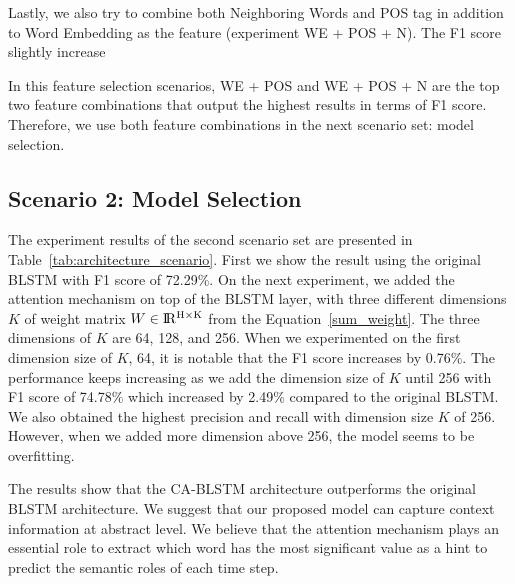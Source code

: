 {{Lastly, we also try to combine both Neighboring Words and POS tag in addition to Word Embedding as the feature (experiment WE + POS + N). The F1 score slightly increase


In this feature selection scenarios, WE + POS and WE + POS + N are the top two feature combinations that output the highest results in terms of F1 score. Therefore, we use both feature combinations in the next scenario set: model selection.

\subsection{Scenario 2: Model Selection}
The experiment results of the second scenario set are presented in Table~\ref{tab:architecture_scenario}. First we show the result using the original BLSTM with F1 score of 72.29\%. On the next experiment, we added the attention mechanism on top of the BLSTM layer, with three different dimensions $K$ of weight matrix $W \in {\rm I\!R^{H \times K}}$ from the Equation~\ref{sum_weight}. The three dimensions of $K$ are 64, 128, and 256. When we experimented on the first dimension size of $K$, 64, it is notable that the F1 score increases by 0.76\%. The performance keeps increasing as we add the dimension size of $K$ until 256 with F1 score of 74.78\% which increased by 2.49\% compared to the original BLSTM. We also obtained the highest precision and recall with dimension size $K$ of 256. However, when we added more dimension above 256, the model seems to be overfitting.

The results show that the CA-BLSTM architecture outperforms the original BLSTM architecture. We suggest that our proposed model can capture context information at abstract level. We believe that the attention mechanism plays an essential role to extract which word has the most significant value as a hint to predict the semantic roles of each time step.

}}
